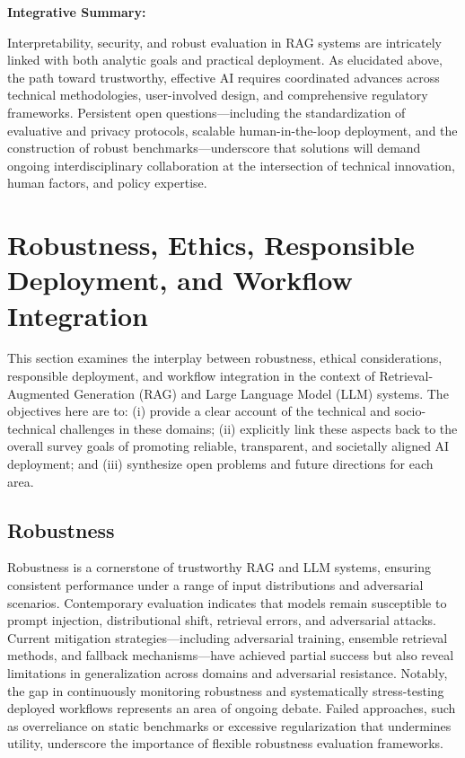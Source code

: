 \documentclass[sigconf]{acmart}
\begin{document}
\textbf{Integrative Summary:} 

Interpretability, security, and robust evaluation in RAG systems are intricately linked with both analytic goals and practical deployment. As elucidated above, the path toward trustworthy, effective AI requires coordinated advances across technical methodologies, user-involved design, and comprehensive regulatory frameworks. Persistent open questions---including the standardization of evaluative and privacy protocols, scalable human-in-the-loop deployment, and the construction of robust benchmarks---underscore that solutions will demand ongoing interdisciplinary collaboration at the intersection of technical innovation, human factors, and policy expertise.

\section{Robustness, Ethics, Responsible Deployment, and Workflow Integration}

This section examines the interplay between robustness, ethical considerations, responsible deployment, and workflow integration in the context of Retrieval-Augmented Generation (RAG) and Large Language Model (LLM) systems. The objectives here are to: (i) provide a clear account of the technical and socio-technical challenges in these domains; (ii) explicitly link these aspects back to the overall survey goals of promoting reliable, transparent, and societally aligned AI deployment; and (iii) synthesize open problems and future directions for each area.

\subsection{Robustness}
Robustness is a cornerstone of trustworthy RAG and LLM systems, ensuring consistent performance under a range of input distributions and adversarial scenarios. Contemporary evaluation indicates that models remain susceptible to prompt injection, distributional shift, retrieval errors, and adversarial attacks. Current mitigation strategies—including adversarial training, ensemble retrieval methods, and fallback mechanisms—have achieved partial success but also reveal limitations in generalization across domains and adversarial resistance. Notably, the gap in continuously monitoring robustness and systematically stress-testing deployed workflows represents an area of ongoing debate. Failed approaches, such as overreliance on static benchmarks or excessive regularization that undermines utility, underscore the importance of flexible robustness evaluation frameworks.
\end{document}
